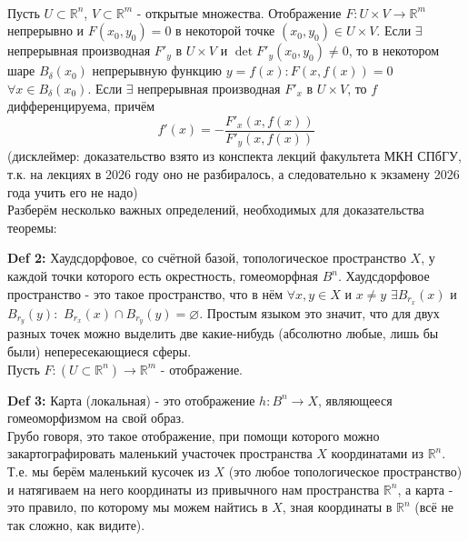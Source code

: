 \documentclass[book, 11pt]{report}
\begin{document}
    \vspace{2cm}
    \par{ \\
    Пусть $U\subset\mathbb{R}^n$, $V\subset\mathbb{R}^m$ - открытые множества. Отображение $F:U\times V\to\mathbb{R}^m$ непрерывно и $F(x_0,y_0)=0$ в некоторой точке $(x_0,y_0)\in U\times V$. Если $\exists$ непрерывная производная $F'_y$ в $U\times V$ и $\det F'_y(x_0,y_0)\ne0$, то в некотором шаре $B_\delta(x_0)$ непрерывную функцию $y=f(x):F(x,f(x))=0$ $\forall x\in B_\delta(x_0)$. Если $\exists$ непрерывная производная $F'_x$ в $U\times V$, то $f$ дифференцируема, причём
    \begin{equation*}
        f'(x)=-\frac{F'_x(x,f(x))}{F'_y(x,f(x))}
    \end{equation*}
     (дисклеймер: доказательство взято из конспекта лекций факультета МКН СПбГУ, т.к. на лекциях в 2026 году оно не разбиралось, а следовательно к экзамену 2026 года учить его не надо)
    \\ Разберём несколько важных определений, необходимых для доказательства теоремы:\\ 
    }
\par{\textbf{Def 2: }Хаудсдорфовое, со счётной базой, топологическое пространство $X$, у каждой точки которого есть окрестность, гомеоморфная $B^n$. Хаудсдорфовое пространство - это такое пространство, что в нём $\forall x,y\in X$ и $x\ne y$ $\exists B_{r_x}(x)$ и $B_{r_y}(y):$ $B_{r_x}(x)\cap B_{r_y}(y)=\varnothing$. Простым языком это значит, что для двух разных точек можно выделить две какие-нибудь (абсолютно любые, лишь бы были) непересекающиеся сферы.\\
Пусть $F:(U\subset\mathbb{R}^n)\to\mathbb{R}^m$ - отображение.
} 
\vspace{0.5cm}
\par{\textbf{Def 3: } Карта (локальная) - это отображение $h:B^n\to X$, являющееся гомеоморфизмом на свой образ. \\ Грубо говоря, это такое отображение, при помощи которого можно закартографировать маленький участочек пространства $X$ координатами из $\mathbb{R}^n$. Т.е. мы берём маленький кусочек из $X$ (это любое топологическое пространство) и натягиваем на него координаты из привычного нам пространства $\mathbb{R}^n$, а карта - это правило, по которому мы можем найтись в $X$, зная координаты в $\mathbb{R}^n$ (всё не так сложно, как видите).}
\vspace{0.5cm}
\end{document}
